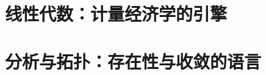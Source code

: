 \documentclass[oneside,fontset=macnew,UTF8]{ctexbook}
\begin{document}
%

\part{线性代数：计量经济学的引擎}








\part{分析与拓扑：存在性与收敛的语言}





\end{document}
